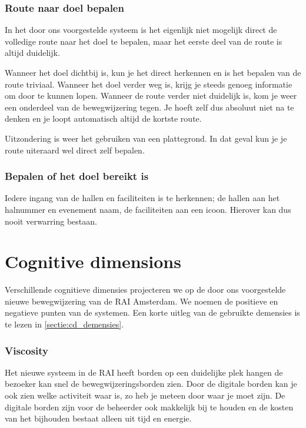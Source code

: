 \subsubsection{Route naar doel bepalen}

In het door ons voorgestelde systeem is het eigenlijk niet mogelijk direct de volledige route naar het doel te bepalen, maar het eerste deel van de route is altijd duidelijk.

Wanneer het doel dichtbij is, kun je het direct herkennen en is het bepalen van de route triviaal. Wanneer het doel verder weg is, krijg je steeds genoeg informatie om door te kunnen lopen. Wanneer de route verder niet duidelijk is, kom je weer een onderdeel van de bewegwijzering tegen. Je hoeft zelf dus absoluut niet na te denken en je loopt automatisch altijd de kortste route.

Uitzondering is weer het gebruiken van een plattegrond. In dat geval kun je je route uiteraard wel direct zelf bepalen.


\subsubsection{Bepalen of het doel bereikt is}

Iedere ingang van de hallen en faciliteiten is te herkennen; de hallen aan het halnummer en evenement naam, de faciliteiten aan een icoon. Hierover kan dus nooit verwarring bestaan.


\section{Cognitive dimensions}

Verschillende cognitieve dimensies projecteren we op de door ons voorgestelde nieuwe bewegwijzering van de RAI Amsterdam. We noemen de positieve en negatieve punten van de systemen. Een korte uitleg van de gebruikte demensies is te lezen in \ref{sectie:cd_demensies}.


\subsubsection{Viscosity}

Het nieuwe systeem in de RAI heeft borden op een duidelijke plek hangen de bezoeker kan snel de bewegwijzeringsborden zien. Door de digitale borden kan je ook zien welke activiteit waar is, zo heb je meteen door waar je moet zijn. De digitale borden zijn voor de beheerder ook makkelijk bij te houden en de kosten van het bijhouden bestaat alleen uit tijd en energie.

